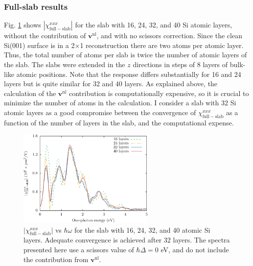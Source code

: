 
\subsubsection{Full-slab results}\label{sec:fsresults}

Fig. \ref{fig:layersconv} shows $|\chi_{\mathrm{full-slab}}^{xxx}|$ for the slab
with 16, 24, 32, and 40 Si atomic layers, without the contribution of
$\mathbf{v}^{\mathrm{nl}}$, and with no scissors correction. Since the clean
Si(001) surface is in a 2$\times$1 reconstruction there are two atoms per atomic
layer. Thus, the total number of atoms per slab is twice the number of atomic
layers of the slab. The slabs were extended in the $z$ directions in steps of 8
layers of bulk-like atomic positions. Note that the response differs
substantially for 16 and 24 layers but is quite similar for 32 and 40 layers. As
explained above, the calculation of the $\mathbf{v}^\mathrm{nl}$ contribution is
computationally expensive, so it is crucial to minimize the number of atoms in
the calculation. I consider a slab with 32 Si atomic layers as a good compromise
between the convergence of $\chi^{xxx}_{\mathrm{full-slab}}$ as a function of
the number of layers in the slab, and the computational expense.

\begin{figure}[H]
\centering 
\includegraphics[width=0.6\textwidth]{content/figures/fig-Si2x1-layerconv}
\caption{$\vert\chi_{\mathrm{full-slab}}^{xxx}\vert$ vs $\hbar\omega$ for the
slab with 16, 24, 32, and 40 atomic Si layers. Adequate convergence is achieved
after 32 layers. The spectra presented here use a scissors value of $\hbar\Delta
= 0$ eV, and do not include the contribution from $\mathbf{v}^{\mathrm{nl}}$.}
\label{fig:layersconv}
\end{figure}



